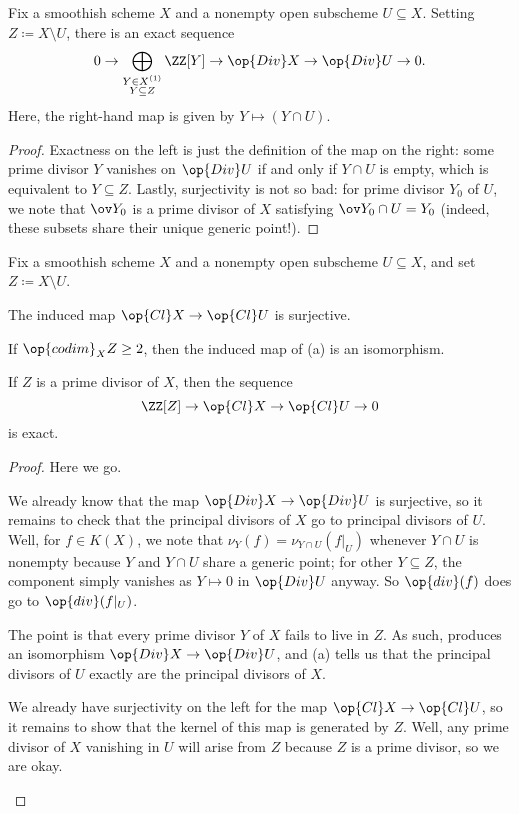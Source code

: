 \documentclass[../notes.tex]{subfiles}
\begin{document}
\begin{proposition} \label{prop:div-exact-seq}
	Fix a smoothish scheme $X$ and a nonempty open subscheme $U\subseteq X$. Setting $Z\coloneqq X\setminus U$, there is an exact sequence
	\[0\to\bigoplus_{\substack{Y\in X^{(1)}\\Y\subseteq Z}}\ZZ[Y]\to\op{Div}X\to\op{Div}U\to0.\]
	Here, the right-hand map is given by $Y\mapsto(Y\cap U)$.
\end{proposition}
\begin{proof}
	Exactness on the left is just the definition of the map on the right: some prime divisor $Y$ vanishes on $\op{Div}U$ if and only if $Y\cap U$ is empty, which is equivalent to $Y\subseteq Z$. Lastly, surjectivity is not so bad: for prime divisor $Y_0$ of $U$, we note that $\ov Y_0$ is a prime divisor of $X$ satisfying $\ov Y_0\cap U=Y_0$ (indeed, these subsets share their unique generic point!).
\end{proof}
\begin{proposition} \label{prop:cl-exact-seq}
	Fix a smoothish scheme $X$ and a nonempty open subscheme $U\subseteq X$, and set $Z\coloneqq X\setminus U$.
	\begin{listalph}
		\item The induced map $\op{Cl}X\to\op{Cl}U$ is surjective.
		\item If $\op{codim}_XZ\ge2$, then the induced map of (a) is an isomorphism.
		\item If $Z$ is a prime divisor of $X$, then the sequence
		\[\ZZ[Z]\to\op{Cl}X\to\op{Cl}U\to0\]
		is exact.
	\end{listalph}
\end{proposition}
\begin{proof}
	Here we go.
	\begin{listalph}
		\item We already know that the map $\op{Div}X\to\op{Div}U$ is surjective, so it remains to check that the principal divisors of $X$ go to principal divisors of $U$. Well, for $f\in K(X)$, we note that $\nu_Y(f)=\nu_{Y\cap U}(f|_U)$ whenever $Y\cap U$ is nonempty because $Y$ and $Y\cap U$ share a generic point; for other $Y\subseteq Z$, the component simply vanishes as $Y\mapsto0$ in $\op{Div}U$ anyway. So $\op{div}(f)$ does go to $\op{div}(f|_U)$.
		\item The point is that every prime divisor $Y$ of $X$ fails to live in $Z$. As such,  produces an isomorphism $\op{Div}X\to\op{Div}U$, and (a) tells us that the principal divisors of $U$ exactly are the principal divisors of $X$.
		\item We already have surjectivity on the left for the map $\op{Cl}X\to\op{Cl}U$, so it remains to show that the kernel of this map is generated by $Z$. Well, any prime divisor of $X$ vanishing in $U$ will arise from $Z$ because $Z$ is a prime divisor, so we are okay.
		\qedhere
	\end{listalph}
\end{proof}
\end{document}
